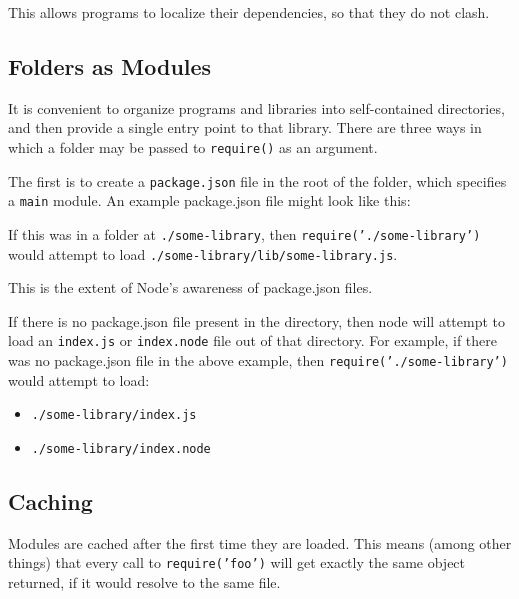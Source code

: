 This allows programs to localize their dependencies, so that they do not
clash.

\subsection{Folders as Modules}\label{folders-as-modules}

It is convenient to organize programs and libraries into self-contained
directories, and then provide a single entry point to that library.
There are three ways in which a folder may be passed to
\texttt{require()} as an argument.

The first is to create a \texttt{package.json} file in the root of the
folder, which specifies a \texttt{main} module. An example package.json
file might look like this:

\begin{Shaded}
\begin{Highlighting}[]
\NormalTok{\{ } \NormalTok{: }\NormalTok{,}
   \NormalTok{: } \NormalTok{\}}
\end{Highlighting}
\end{Shaded}

If this was in a folder at \texttt{./some-library}, then
\texttt{require('./some-library')} would attempt to load
\texttt{./some-library/lib/some-library.js}.

This is the extent of Node's awareness of package.json files.

If there is no package.json file present in the directory, then node
will attempt to load an \texttt{index.js} or \texttt{index.node} file
out of that directory. For example, if there was no package.json file in
the above example, then \texttt{require('./some-library')} would attempt
to load:

\begin{itemize}
\itemsep1pt\parskip0pt
\item
  \texttt{./some-library/index.js}
\item
  \texttt{./some-library/index.node}
\end{itemize}

\subsection{Caching}\label{caching}

Modules are cached after the first time they are loaded. This means
(among other things) that every call to \texttt{require('foo')} will get
exactly the same object returned, if it would resolve to the same file.

